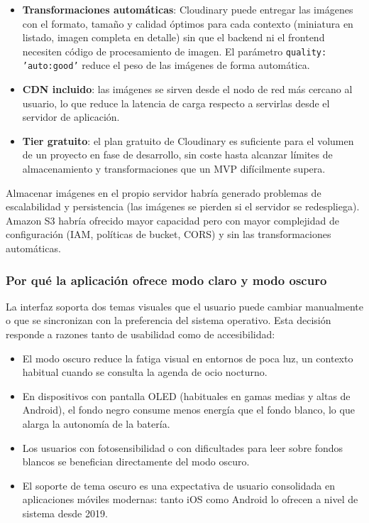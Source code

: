 \begin{itemize}
    \item \textbf{Transformaciones automáticas}: Cloudinary puede entregar las imágenes con el formato, tamaño y calidad óptimos para cada contexto (miniatura en listado, imagen completa en detalle) sin que el backend ni el frontend necesiten código de procesamiento de imagen. El parámetro \texttt{quality: 'auto:good'} reduce el peso de las imágenes de forma automática.
    \item \textbf{CDN incluido}: las imágenes se sirven desde el nodo de red más cercano al usuario, lo que reduce la latencia de carga respecto a servirlas desde el servidor de aplicación.
    \item \textbf{Tier gratuito}: el plan gratuito de Cloudinary es suficiente para el volumen de un proyecto en fase de desarrollo, sin coste hasta alcanzar límites de almacenamiento y transformaciones que un MVP difícilmente supera.
\end{itemize}

Almacenar imágenes en el propio servidor habría generado problemas de escalabilidad y persistencia (las imágenes se pierden si el servidor se redespliega). Amazon S3 habría ofrecido mayor capacidad pero con mayor complejidad de configuración (IAM, políticas de bucket, CORS) y sin las transformaciones automáticas.

\subsubsection{Por qué la aplicación ofrece modo claro y modo oscuro}

La interfaz soporta dos temas visuales que el usuario puede cambiar manualmente o que se sincronizan con la preferencia del sistema operativo. Esta decisión responde a razones tanto de usabilidad como de accesibilidad:

\begin{itemize}
    \item El modo oscuro reduce la fatiga visual en entornos de poca luz, un contexto habitual cuando se consulta la agenda de ocio nocturno.
    \item En dispositivos con pantalla OLED (habituales en gamas medias y altas de Android), el fondo negro consume menos energía que el fondo blanco, lo que alarga la autonomía de la batería.
    \item Los usuarios con fotosensibilidad o con dificultades para leer sobre fondos blancos se benefician directamente del modo oscuro.
    \item El soporte de tema oscuro es una expectativa de usuario consolidada en aplicaciones móviles modernas: tanto iOS como Android lo ofrecen a nivel de sistema desde 2019.
\end{itemize}

